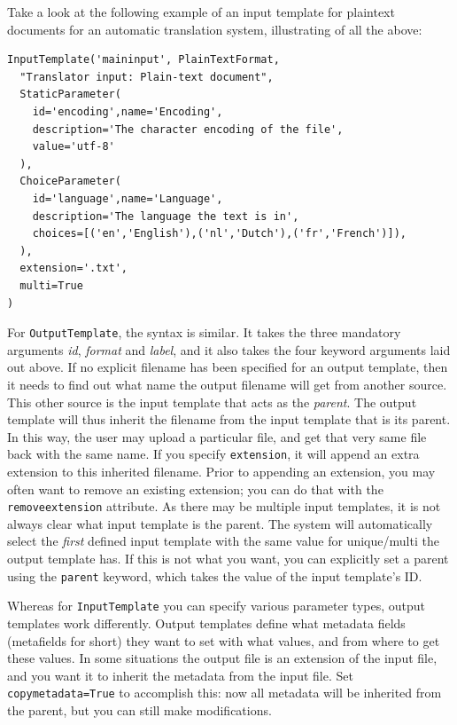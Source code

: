 \documentclass[a4paper,12pt,twoside,openright]{report}
\begin{document}
Take a look at the following example of an input template for plaintext
documents for an automatic translation system, illustrating of all the above:

{\small
\begin{verbatim}
InputTemplate('maininput', PlainTextFormat,
  "Translator input: Plain-text document",  
  StaticParameter(
    id='encoding',name='Encoding',
    description='The character encoding of the file', 
    value='utf-8'
  ),  
  ChoiceParameter(
    id='language',name='Language',
    description='The language the text is in', 
    choices=[('en','English'),('nl','Dutch'),('fr','French')]),
  ),      
  extension='.txt',
  multi=True
)
\end{verbatim}
}


For \texttt{OutputTemplate}, the syntax is similar. It takes the three
mandatory arguments \emph{id}, \emph{format} and \emph{label}, and it also
takes the four keyword arguments laid out above. If no explicit filename has
been specified for an output template, then it needs to find out what name the
output filename will get from another source. This other source is the input
template that acts as the \emph{parent}. The output template will thus inherit
the filename from the input template that is its parent. In this way, the user
may upload a particular file, and get that very same file back with the same
name. If you specify \texttt{extension}, it will append an extra extension to
this inherited filename. Prior to appending an extension, you may often want to
remove an existing extension; you can do that with the \texttt{removeextension}
attribute. 
As there may be multiple input templates, it is not always clear what input
template is the parent. The system will automatically select the \emph{first}
defined input template with the same value for unique/multi the output template
has. If this is not what you want, you can explicitly set a parent using the
\texttt{parent} keyword, which takes the value of the input template's ID.

Whereas for \texttt{InputTemplate} you can specify various parameter types,
output templates work differently. Output templates define what metadata fields
(metafields for short) they want to set with what values, and from where to get
these values. In some situations the output file is an extension of the input
file, and you want it to inherit the metadata from the input file. Set
\texttt{copymetadata=True} to accomplish this: now all metadata will be
inherited from the parent, but you can still make modifications.
\end{document}
